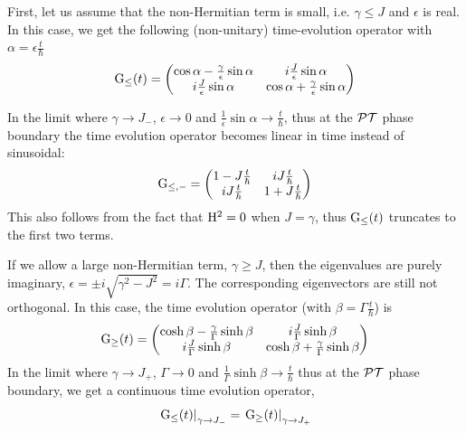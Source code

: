 First, let us assume that the non-Hermitian term is small, i.e. \( \gamma \leq
J \) and \( \epsilon \) is real. In this case, we get the following
(non-unitary) time-evolution operator with \( \alpha = \epsilon \frac{t}{\hbar}
\)
\begin{equation}
  \mathrm{G}_{\leq} \!\left(t\right) = \begin{pmatrix}
    \cos \alpha - \frac{\gamma}{\epsilon} \sin \alpha &
    i \frac{J}{\epsilon} \sin \alpha \\
    i \frac{J}{\epsilon} \sin \alpha &
    \cos \alpha + \frac{\gamma}{\epsilon} \sin \alpha
  \end{pmatrix}
\end{equation}

In the limit where \( \gamma \rightarrow J_{-} \), \( \epsilon \rightarrow 0 \)
and \( \frac{1}{\epsilon} \sin \alpha \rightarrow \frac{t}{\hbar} \), thus at
the \(\mathcal{PT}{}\) phase boundary the time evolution operator becomes linear in time
instead of sinusoidal:
\begin{equation}
  \mathrm{G}_{\leq,-} = \begin{pmatrix}
    1-J\frac{t}{\hbar} & i J\frac{t}{\hbar} \\
    i J\frac{t}{\hbar} & 1+J\frac{t}{\hbar}
  \end{pmatrix}
\end{equation}
This also follows from the fact that \( \mathrm{H}^{2} = 0\) when \(J = \gamma\),
thus \( \mathrm{G}_{\leq} \!\left(t\right) \) truncates to the first two terms.

If we allow a large non-Hermitian term, \( \gamma \geq J \), then the
eigenvalues are purely imaginary, \( \epsilon = \pm i \sqrt{ \gamma^{2} - J^{2}
} = i \Gamma \). The corresponding eigenvectors are still not orthogonal. In
this case, the time evolution operator (with \( \beta = \Gamma \frac{t}{\hbar}
\)) is
\begin{equation}
  \mathrm{G}_{\geq} \!\left(t\right) = \begin{pmatrix}
    \cosh \beta - \frac{\gamma}{\Gamma} \sinh \beta &
    i \frac{J}{\Gamma} \sinh \beta \\
    i \frac{J}{\Gamma} \sinh \beta &
    \cosh \beta + \frac{\gamma}{\Gamma} \sinh \beta
  \end{pmatrix}
\end{equation}
In the limit where \( \gamma \rightarrow J_{+} \), \( \Gamma \rightarrow 0 \)
and \( \frac{1}{\Gamma} \sinh \beta \rightarrow \frac{t}{\hbar} \) thus at the
\(\mathcal{PT}{}\) phase boundary, we get a continuous time evolution operator,
\begin{equation}
  \left. \mathrm{G}_{\leq} \!\left(t\right) \right|_{\gamma \rightarrow J_{-}} = \left.
    \mathrm{G}_{\geq} \!\left(t\right) \right|_{\gamma \rightarrow J_{+}}
\end{equation}

